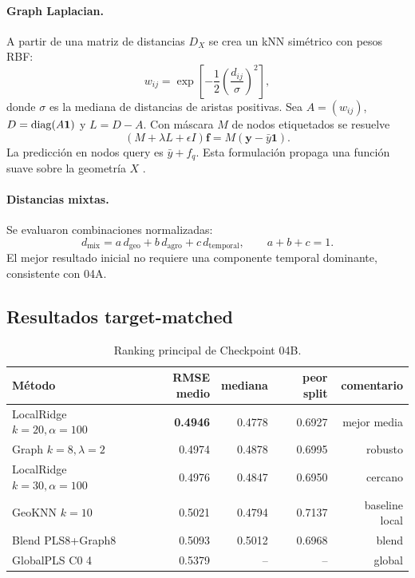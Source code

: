 \paragraph{Graph Laplacian.}
A partir de una matriz de distancias $D_X$ se crea un kNN simétrico con pesos RBF:
\[
w_{ij}
=
\exp\left[
-\frac12\left(\frac{d_{ij}}{\sigma}\right)^2
\right],
\]
donde $\sigma$ es la mediana de distancias de aristas positivas. Sea $A=(w_{ij})$,
$D=\operatorname{diag}(A\bm 1)$ y $L=D-A$. Con máscara $M$ de nodos etiquetados se resuelve
\begin{equation}
(M+\lambda L+\epsilon I)\bm f
=
M(\bm y-\bar y\bm 1).
\label{eq:graph-laplacian}
\end{equation}
La predicción en nodos query es $\bar y+f_q$. Esta formulación propaga una función suave sobre
la geometría $X$ \citep{Zhou2004,Belkin2006}.

\paragraph{Distancias mixtas.}
Se evaluaron combinaciones normalizadas:
\[
d_{\mathrm{mix}}
=
a\,d_{\mathrm{geo}}
+b\,d_{\mathrm{agro}}
+c\,d_{\mathrm{temporal}},
\qquad a+b+c=1.
\]
El mejor resultado inicial no requiere una componente temporal dominante, consistente con 04A.

\subsection{Resultados target-matched}

\begin{table}[H]
\centering
\caption{Ranking principal de Checkpoint 04B.}
\label{tab:cp04b-primary}
\begin{tabular}{lrrrr}
\toprule
Método & RMSE medio & mediana & peor split & comentario \\
\midrule
LocalRidge $k=20,\alpha=100$ & \textbf{0.4946} & 0.4778 & 0.6927 & mejor media \\
Graph $k=8,\lambda=2$ & 0.4974 & 0.4878 & 0.6995 & robusto \\
LocalRidge $k=30,\alpha=100$ & 0.4976 & 0.4847 & 0.6950 & cercano \\
GeoKNN $k=10$ & 0.5021 & 0.4794 & 0.7137 & baseline local \\
Blend PLS8+Graph8 & 0.5093 & 0.5012 & 0.6968 & blend \\
GlobalPLS C0 4 & 0.5379 & -- & -- & global \\
\bottomrule
\end{tabular}
\end{table}

